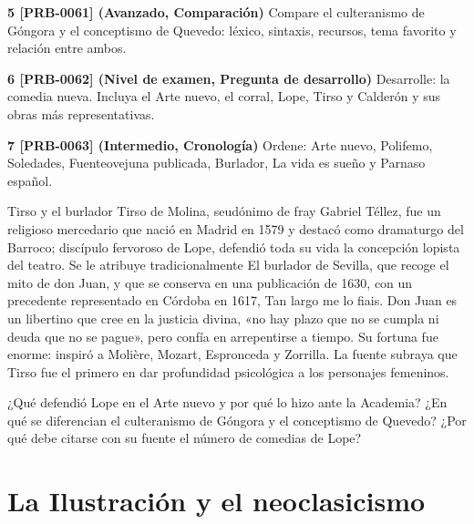 \documentclass{book}
\begin{document}
\begin{tcolorbox}[title={Ejercicios}, studiumworked, breakable]
\noindent\textbf{5 [PRB-0061] (Avanzado, Comparación)}
Compare el culteranismo de Góngora y el conceptismo de Quevedo: léxico, sintaxis, recursos, tema favorito y relación entre ambos.


\noindent\textbf{6 [PRB-0062] (Nivel de examen, Pregunta de desarrollo)}
Desarrolle: la comedia nueva. Incluya el Arte nuevo, el corral, Lope, Tirso y Calderón y sus obras más representativas.


\noindent\textbf{7 [PRB-0063] (Intermedio, Cronología)}
Ordene: Arte nuevo, Polifemo, Soledades, Fuenteovejuna publicada, Burlador, La vida es sueño y Parnaso español.

\end{tcolorbox}

\begin{tcolorbox}[title={Autoficha}, studiumcheck, breakable]

Tirso y el burlador
Tirso de Molina, seudónimo de fray Gabriel Téllez, fue un religioso mercedario que nació en Madrid en 1579 y destacó como dramaturgo del Barroco; discípulo fervoroso de Lope, defendió toda su vida la concepción lopista del teatro. Se le atribuye tradicionalmente El burlador de Sevilla, que recoge el mito de don Juan, y que se conserva en una publicación de 1630, con un precedente representado en Córdoba en 1617, Tan largo me lo fiais. Don Juan es un libertino que cree en la justicia divina, «no hay plazo que no se cumpla ni deuda que no se pague», pero confía en arrepentirse a tiempo. Su fortuna fue enorme: inspiró a Molière, Mozart, Espronceda y Zorrilla. La fuente subraya que Tirso fue el primero en dar profundidad psicológica a los personajes femeninos.


¿Qué defendió Lope en el Arte nuevo y por qué lo hizo ante la Academia? ¿En qué se diferencian el culteranismo de Góngora y el conceptismo de Quevedo? ¿Por qué debe citarse con su fuente el número de comedias de Lope?

\end{tcolorbox}

\chapter{La Ilustración y el neoclasicismo}
\label{chap:lit-08}
\end{document}
